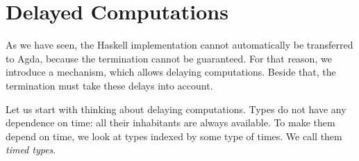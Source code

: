 
\section{Delayed Computations}
As we have seen, the Haskell implementation cannot automatically be transferred to Agda, because the termination cannot be guaranteed.
For that reason, we introduce a mechanism, which allows delaying computations.
Beside that, the termination must take these delays into account.

Let us start with thinking about delaying computations.
Types do not have any dependence on time: all their inhabitants are always available.
To make them depend on time, we look at types indexed by some type of times.
We call them \emph{timed types}.

